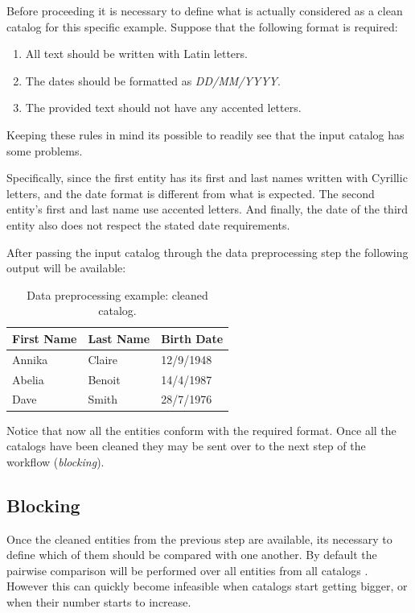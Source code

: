 \documentclass[epsfig,a4paper,11pt,titlepage,twoside,openany]{book}
\begin{document}
Before proceeding it is necessary to define what is  actually considered as a clean catalog for this
specific example. Suppose that the following format is required:

\begin{enumerate}
\item All text should be written with Latin letters.
\item The dates should be formatted as \textit{DD/MM/YYYY}.
\item The provided text should not have any accented letters.
\end{enumerate}

Keeping these rules in mind its possible to readily see that the input catalog has some
problems. 

Specifically, since the first entity has its first and last names written
with Cyrillic letters, and the date format is different from what is expected. The
second entity's first and last name use accented letters. And finally, the date of
the third entity also does not respect the stated date requirements.

After passing the input catalog through the data preprocessing step the following output will be available:

\begin{table}[H]
  \centering

  \begin{tabular}{l|l|l}
    First Name & Last Name & Birth Date \\ \hline
    Annika     & Claire    & 12/9/1948  \\
    Abelia     & Benoit    & 14/4/1987  \\
    Dave       & Smith     & 28/7/1976   
  \end{tabular}
  
  \caption{Data preprocessing example: cleaned catalog.}
  \label{tab:data-prepr-ex-cleaned}
\end{table}

Notice that now all the entities conform with the required format. Once all the
catalogs have been cleaned they may be sent over to the next step of the workflow
(\textit{blocking}).



\subsection{Blocking}
\label{sec:rl-workflow-blocking}

Once the cleaned entities from the previous step are available, its necessary to define which
of them should be compared with one another. By default the pairwise comparison will be performed over all entities from all catalogs . However this can quickly
become infeasible when catalogs start getting bigger, or when their number starts to increase. 
\end{document}
